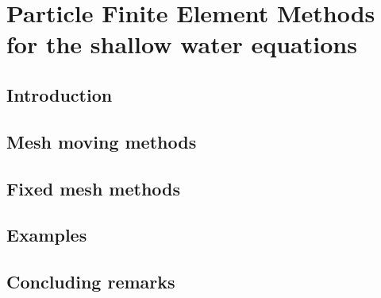 
\chapter{Particle Finite Element Methods for the shallow water equations}
\label{lagrangian_sw}



\section{Introduction}



\section{Mesh moving methods}



\section{Fixed mesh methods}



\section{Examples}



\section{Concluding remarks}


